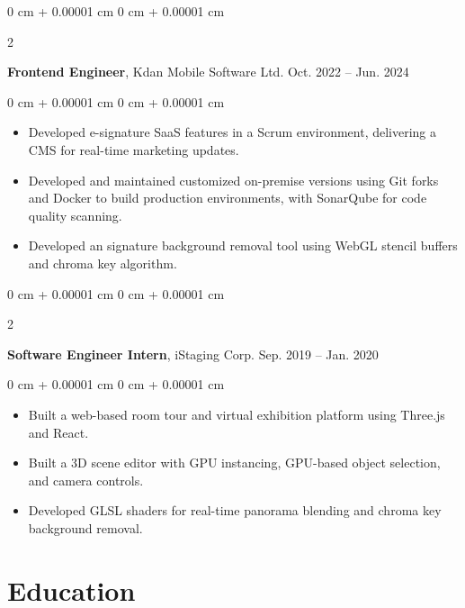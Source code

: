 \documentclass[10pt, letterpaper]{article}
\newenvironment{highlights}{
    \begin{itemize}[
        topsep=0.10 cm,
        parsep=0.10 cm,
        partopsep=0pt,
        itemsep=0pt,
        leftmargin=0 cm + 10pt
    ]
}{
    \end{itemize}
} %
\newenvironment{onecolentry}{
    \begin{adjustwidth}{
        0 cm + 0.00001 cm
    }{
        0 cm + 0.00001 cm
    }
}{
    \end{adjustwidth}
} %
\newenvironment{twocolentry}[2][]{
    \onecolentry
    \def\secondColumn{#2}
    \setcolumnwidth{\fill, 4.5 cm}
    \begin{paracol}{2}
}{
    \switchcolumn \raggedleft \secondColumn
    \end{paracol}
    \endonecolentry
} %
\begin{document}
        \vspace{0.2 cm}

        \begin{twocolentry}{
            Oct. 2022 – Jun. 2024
        }
            \textbf{Frontend Engineer}, Kdan Mobile Software Ltd.\end{twocolentry}

        \vspace{0.10 cm}
        \begin{onecolentry}
            \begin{highlights}
                \item Developed e-signature SaaS features in a Scrum environment, delivering a CMS for real-time marketing updates.
                \item Developed and maintained customized on-premise versions using Git forks and Docker to build production environments, with SonarQube for code quality scanning.
                \item Developed an signature background removal tool using WebGL stencil buffers and chroma key algorithm.
            \end{highlights}
        \end{onecolentry}

        \vspace{0.2 cm}

        \begin{twocolentry}{
            Sep. 2019 – Jan. 2020
        }
            \textbf{Software Engineer Intern}, iStaging Corp.\end{twocolentry}

        \vspace{0.10 cm}
        \begin{onecolentry}
            \begin{highlights}
                \item Built a web-based room tour and virtual exhibition platform using Three.js and React.
                \item Built a 3D scene editor with GPU instancing, GPU-based object selection, and camera controls.
                \item Developed GLSL shaders for real-time panorama blending and chroma key background removal.
            \end{highlights}
        \end{onecolentry}

    
    
    \section{Education}
    
\end{document}
